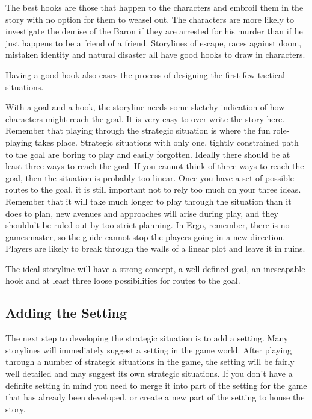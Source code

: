 \documentclass[twoside]{book}
\begin{document}
The best hooks are those that happen to the characters and embroil
them in the story with no option for them to weasel out. The
characters are more likely to investigate the demise of the Baron if
they are arrested for his murder than if he just happens to be a
friend of a friend. Storylines of escape, races against doom, mistaken
identity and natural disaster all have good hooks to draw in
characters.

Having a good hook also eases the process of designing the first few
tactical situations.

With a goal and a hook, the storyline needs some sketchy indication of
how characters might reach the goal. It is very easy to over write the
story here. Remember that playing through the strategic situation is
where the fun role-playing takes place. Strategic situations with only
one, tightly constrained path to the goal are boring to play and
easily forgotten. Ideally there should be at least three ways to reach
the goal. If you cannot think of three ways to reach the goal, then
the situation is probably too linear. Once you have a set of possible
routes to the goal, it is still important not to rely too much on your
three ideas. Remember that it will take much longer to play through
the situation than it does to plan, new avenues and approaches will
arise during play, and they shouldn't be ruled out by too strict
planning. In Ergo, remember, there is no gamesmaster, so the guide
cannot stop the players going in a new direction. Players are likely
to break through the walls of a linear plot and leave it in ruins.

The ideal storyline will have a strong concept, a well defined goal,
an inescapable hook and at least three loose possibilities for routes
to the goal.

\subsection{Adding the Setting}

The next step to developing the strategic situation is to add a
setting. Many storylines will immediately suggest a setting in the
game world. After playing through a number of strategic situations in
the game, the setting will be fairly well detailed and may suggest its
own strategic situations. If you don't have a definite setting in mind
you need to merge it into part of the setting for the game that has
already been developed, or create a new part of the setting to house
the story.
\end{document}
